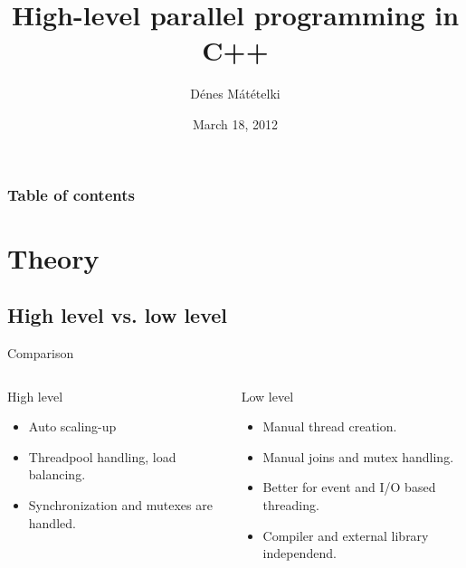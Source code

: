 \documentclass{beamer}
\title {High-level parallel programming in C++}
\author{Dénes Mátételki}
\institute{www.emerson.com}
\date{March 18, 2012}
\begin{document}

\begin{frame}
\titlepage
\end{frame}


\begin{frame}
\frametitle{Table of contents}
\tableofcontents
\end{frame}

\section{Theory}

\subsection{High level vs. low level}


\begin{frame}{Comparison}
\begin{columns}[t]
\column{1.5in}

\begin{block}{High level}
\small 
\begin{itemize}
  \item Auto scaling-up
  \item Threadpool handling, load balancing.
  \item Synchronization and mutexes are handled.
\end{itemize}
\end{block}

\column{1.5in}

\begin{block}{Low level}
\small
\begin{itemize}
  \item Manual thread creation.
  \item Manual joins and mutex handling.
  \item Better for event and I/O based threading.
  \item Compiler and external library independend.
\end{itemize}
\end{block}

\end{columns}
\end{frame}
\end{document}
